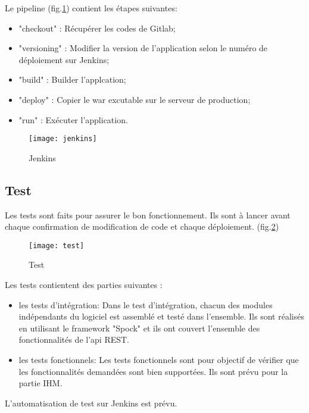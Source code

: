 Le pipeline (fig.\ref{fig:jenkins}) contient les étapes suivantes:
\begin{itemize}
 \item "checkout" : Récupérer les codes de Gitlab;
 \item "versioning" : Modifier la version de l'application selon le numéro de déploiement sur Jenkins;
 \item "build" : Builder l'applcation;
 \item "deploy" : Copier le war excutable sur le serveur de production;
 \item "run" : Exécuter l'application.
\end{itemize}

\begin{figure}[ht]
 \centering
 \texttt{[image: jenkins]}
 \caption{Jenkins}
 \label{fig:jenkins}
\end{figure}

\subsection{Test}

Les tests sont faits pour assurer le bon fonctionnement.
Ils sont à lancer avant chaque confirmation de modification de code et chaque déploiement. (fig.\ref{fig:test})

\begin{figure}[ht]
 \centering
 \texttt{[image: test]}
 \caption{Test}
 \label{fig:test}
\end{figure}

Les tests contientent des parties suivantes :
\begin{itemize}
 \item les tests d'intégration:
       Dans le test d’intégration, chacun des modules indépendants du logiciel est assemblé et testé dans l’ensemble.
       Ils sont réalisés en utilisant le framework "Spock" et ils ont couvert l'ensemble des fonctionnalités de l'api REST.
 \item les tests fonctionnels:
       Les tests fonctionnels sont pour objectif de  vérifier que les fonctionnalités demandées sont bien supportées.
       Ils sont prévu pour la partie IHM.
\end{itemize}

L'automatisation de test sur Jenkins est prévu.

\clearpage
